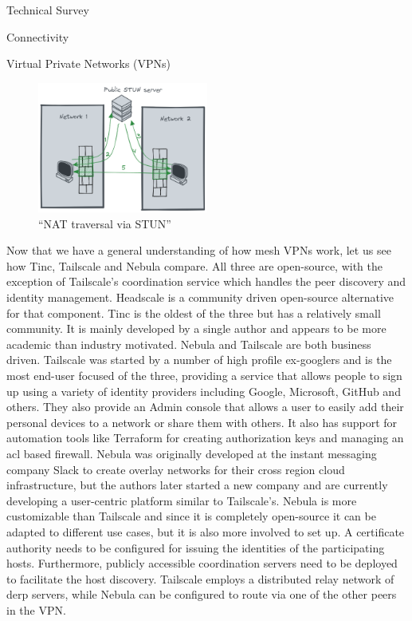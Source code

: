 \begin{frame}{Technical Survey}
\begin{block}{Connectivity}
\begin{block}{Virtual Private Networks (VPNs)}
\begin{figure}
\centering
\includegraphics[width=0.5\textwidth,height=0.25\textheight]{prep/../figures/nat-traversal.png}
\caption{``NAT traversal via STUN''\label{nat-traversal}}
\end{figure}

Now that we have a general understanding of how mesh VPNs work, let us
see how Tinc, Tailscale and Nebula compare. All three are open-source,
with the exception of Tailscale's coordination service which handles the
peer discovery and identity management. Headscale
\autocite{fontJuanfontHeadscale2022} is a community driven open-source
alternative for that component. Tinc is the oldest of the three but has
a relatively small community. It is mainly developed by a single author
and appears to be more academic than industry motivated. Nebula and
Tailscale are both business driven. Tailscale was started by a number of
high profile ex-googlers and is the most end-user focused of the three,
providing a service that allows people to sign up using a variety of
identity providers including Google, Microsoft, GitHub and others. They
also provide an Admin console that allows a user to easily add their
personal devices to a network or share them with others. It also has
support for automation tools like Terraform for creating authorization
keys and managing an \gls{acl} based firewall. Nebula was originally
developed at the instant messaging company Slack to create overlay
networks for their cross region cloud infrastructure, but the authors
later started a new company and are currently developing a user-centric
platform similar to Tailscale's. Nebula is more customizable than
Tailscale and since it is completely open-source it can be adapted to
different use cases, but it is also more involved to set up. A
certificate authority needs to be configured for issuing the identities
of the participating hosts. Furthermore, publicly accessible
coordination servers need to be deployed to facilitate the host
discovery. Tailscale employs a distributed relay network of \gls{derp}
servers, while Nebula can be configured to route via one of the other
peers in the VPN.


\end{block}
\end{block}
\end{frame}
